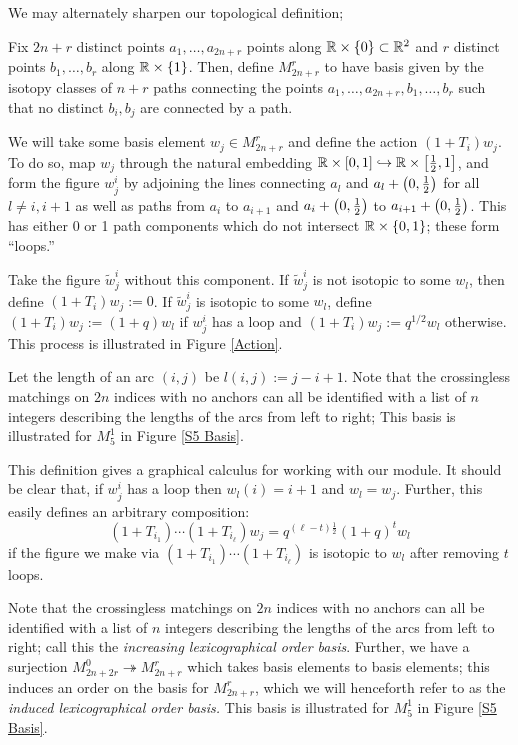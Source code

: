 \documentclass{amsart}
\begin{document}
We may alternately sharpen our topological definition;
\begin{definition}
Fix $2n + r$ distinct points $a_1,\dots,a_{2n + r}$ points along $\mathbb{R} \times \left\{ 0 \right\} \subset \mathbb{R}^2$ and $r$ distinct points $b_1,\dots,b_r$ along $\mathbb{R} \times \left\{ 1 \right\}$.
Then, define $M_{2n + r}^r$ to have basis given by the isotopy classes of $n + r$ paths connecting the points $a_1,\dots,a_{2n+r},b_1,\dots,b_r$ such that no distinct $b_i,b_j$ are connected by a path. 

We will take some basis element $w_j \in M_{2n +r}^r$ and define the action $(1 + T_i)w_j$.
To do so, map $w_j$ through the natural embedding $\mathbb{R} \times \left[ 0,1 \right] \hookrightarrow \mathbb{R} \times \left[ \frac{1}{2},1 \right]$, and form the figure $w_j^i$ by adjoining the lines connecting $a_l$ and $a_l + \left( 0,\frac{1}{2} \right)$ for all $l \neq i,i+1$ as well as paths from $a_i$ to $a_{i+1}$ and $a_i + \left( 0,\frac{1}{2} \right)$ to $a_{i+1} + \left( 0,\frac{1}{2} \right)$.
This has either 0 or 1 path components which do not intersect $\mathbb{R} \times \left\{ 0,1 \right\}$;
these form ``loops.''

Take the figure $\tilde w_j^i$ without this component.
If $\tilde w_j^i$ is not isotopic to some $w_l$, then define $(1 + T_i)w_j := 0$.
If $\tilde w_j^i$ is isotopic to some $w_l$, define $(1 + T_i)w_j := (1 + q)w_l$ if $w_j^i$ has a loop and $(1 + T_i)w_j := q^{1/2}w_l$ otherwise.
This process is illustrated in Figure \ref{Action}.
\end{definition}
  
Let the length of an arc $(i,j)$ be $l(i,j) := j - i + 1$.
Note that the crossingless matchings on $2n$ indices with no anchors can all be identified with a list of $n$ integers describing the lengths of the arcs from left to right;
  This basis is illustrated for $M_{5}^1$ in Figure \ref{S5 Basis}. 

\begin{remark}
  This definition gives a graphical calculus for working with our module.
  It should be clear that, if $w_j^i$ has a loop then $w_l(i) = i+1$ and $w_l = w_j$.
  Further, this easily defines an arbitrary composition:
  \[
    (1 + T_{i_1})\cdots(1 + T_{i_\ell})w_j = q^{(\ell - t)\frac{1}{2}}(1 + q)^tw_l
  \]
  if the figure we make via $(1+T_{i_1})\cdots(1+T_{i_\ell})$ is isotopic to $w_l$ after removing $t$ loops.
\end{remark}
  
  Note that the crossingless matchings on $2n$ indices with no anchors can all be identified with a list of $n$ integers describing the lengths of the arcs from left to right;
  call this the \emph{increasing lexicographical order basis}.
  Further, we have a surjection $M_{2n + 2r}^0 \twoheadrightarrow M_{2n + r}^r$ which takes basis elements to basis elements;
  this induces an order on the basis for $M_{2n +r}^r$, which we will henceforth refer to as the \emph{induced lexicographical order basis.}
  This basis is illustrated for $M_{5}^1$ in Figure \ref{S5 Basis}. 
\end{document}
